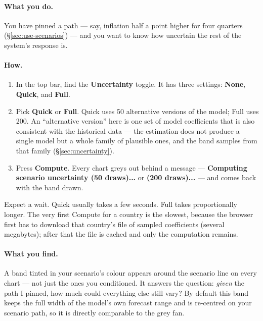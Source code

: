 \documentclass[11pt]{article}
\theoremstyle{definition}
\theoremstyle{remark}
\begin{document}
\paragraph{What you do.} You have pinned a path --- say, inflation half a point higher
for four quarters (\S\ref{sec:use-scenarios}) --- and you want to know how uncertain
the rest of the system's response is.

\paragraph{How.}
\begin{enumerate}
  \item In the top bar, find the \textbf{Uncertainty} toggle. It has three settings:
    \textbf{None}, \textbf{Quick}, and \textbf{Full}.
  \item Pick \textbf{Quick} or \textbf{Full}. Quick uses 50 alternative versions of
    the model; Full uses 200. An ``alternative version'' here is one set of model
    coefficients that is also consistent with the historical data --- the estimation
    does not produce a single model but a whole family of plausible ones, and the band
    samples from that family (\S\ref{sec:uncertainty}).
  \item Press \textbf{Compute}. Every chart greys out behind a message ---
    \textbf{Computing scenario uncertainty (50 draws)...} or \textbf{(200 draws)...}
    --- and comes back with the band drawn.
\end{enumerate}
Expect a wait. Quick usually takes a few seconds. Full takes proportionally longer.
The very first Compute for a country is the slowest, because the browser first has to
download that country's file of sampled coefficients (several megabytes); after that
the file is cached and only the computation remains.

\paragraph{What you find.} A band tinted in your scenario's colour appears around the
scenario line on every chart --- not just the ones you conditioned. It answers the
question: \emph{given} the path I pinned, how much could everything else still vary?
By default this band keeps the full width of the model's own forecast range and is
re-centred on your scenario path, so it is directly comparable to the grey fan.
\end{document}
